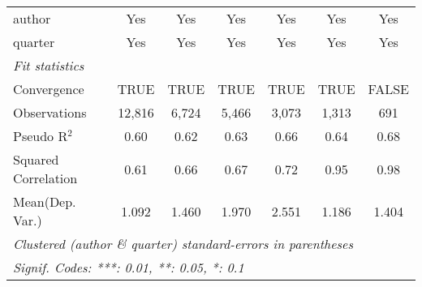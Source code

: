 \begin{tabular}{lcccccc}
   author                                                     & Yes           & Yes          & Yes            & Yes            & Yes           & Yes\\  
   quarter                                                    & Yes           & Yes          & Yes            & Yes            & Yes           & Yes\\  
   \midrule
   \emph{Fit statistics}\\
   Convergence                                                &TRUE           & TRUE         & TRUE           & TRUE           & TRUE          & FALSE\\  
   Observations                                               & 12,816        & 6,724        & 5,466          & 3,073          & 1,313         & 691\\  
   Pseudo R$^2$                                               & 0.60          & 0.62         & 0.63           & 0.66           & 0.64          & 0.68\\  
   Squared Correlation                                        & 0.61          & 0.66         & 0.67           & 0.72           & 0.95          & 0.98\\  
Mean(Dep. Var.) & 1.092 & 1.460 & 1.970 & 2.551 & 1.186 & 1.404 \\
   \midrule \midrule
   \multicolumn{7}{l}{\emph{Clustered (author \& quarter) standard-errors in parentheses}}\\
   \multicolumn{7}{l}{\emph{Signif. Codes: ***: 0.01, **: 0.05, *: 0.1}}\\
\end{tabular}
\par\endgroup
